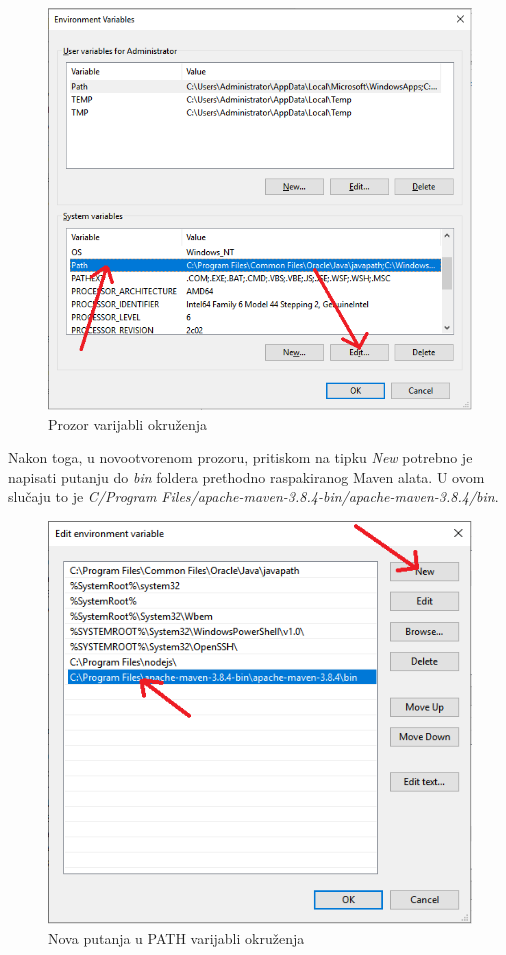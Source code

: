 			\begin{figure}[H]
			\centering
			\includegraphics[width=\textwidth, scale=0.5]{slike/EnvironmentVariables}
			\caption{Prozor varijabli okruženja}
			\label{fig:EnvironmentVariables}
			\end{figure}
			
			\eject
			Nakon toga, u novootvorenom prozoru, pritiskom na tipku \textit{New} potrebno je napisati putanju do \textit{bin} foldera prethodno raspakiranog Maven alata. U ovom slučaju to je \textit{C/Program Files/apache-maven-3.8.4-bin/apache-maven-3.8.4/bin}.
			
			\begin{figure}[H]
			\centering
			\includegraphics[width=\textwidth, scale=0.5]{slike/newPathInsert}
			\caption{Nova putanja u PATH varijabli okruženja}
			\label{fig:newPathInsert}
			\end{figure}
			
